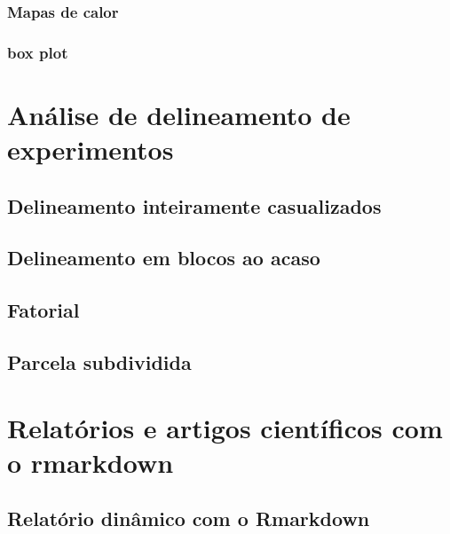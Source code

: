 \documentclass[
]{book}
\begin{document}
\hypertarget{mapas-de-calor}{%
\subsection{Mapas de calor}\label{mapas-de-calor}}

\hypertarget{box-plot}{%
\subsection{box plot}\label{box-plot}}

\hypertarget{ade}{%
\chapter{Análise de delineamento de experimentos}\label{ade}}

\hypertarget{delineamento-inteiramente-casualizados}{%
\section{Delineamento inteiramente casualizados}\label{delineamento-inteiramente-casualizados}}

\hypertarget{delineamento-em-blocos-ao-acaso}{%
\section{Delineamento em blocos ao acaso}\label{delineamento-em-blocos-ao-acaso}}

\hypertarget{fatorial}{%
\section{Fatorial}\label{fatorial}}

\hypertarget{parcela-subdividida}{%
\section{Parcela subdividida}\label{parcela-subdividida}}

\hypertarget{rmd}{%
\chapter{Relatórios e artigos científicos com o rmarkdown}\label{rmd}}

\hypertarget{relatuxf3rio-dinuxe2mico-com-o-rmarkdown}{%
\section{Relatório dinâmico com o Rmarkdown}\label{relatuxf3rio-dinuxe2mico-com-o-rmarkdown}}
\end{document}
